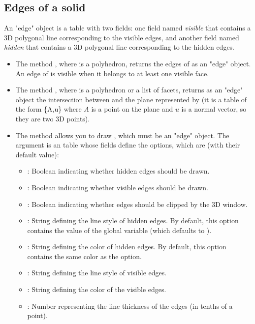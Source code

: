 \subsection{Edges of a solid}

An "edge" object is a table with two fields: one field named \emph{visible} that contains a 3D polygonal line corresponding to the visible edges, and another field named \emph{hidden} that contains a 3D polygonal line corresponding to the hidden edges.

\begin{itemize}
    \item The method , where  is a polyhedron, returns the edges of  as an "edge" object. An edge of  is visible when it belongs to at least one visible face.

     \item The method , where  is a polyhedron or a list of facets, returns as an "edge" object the intersection between  and the plane represented by  (it is a table of the form \{A,u\} where $A$ is a point on the plane and $u$ is a normal vector, so they are two 3D points).

    \item The method  allows you to draw , which must be an "edge" object. The argument  is an table whose fields define the options, which are (with their default value):
\begin{itemize}
    \item {}: Boolean indicating whether hidden edges should be drawn.
    \item {}: Boolean indicating whether visible edges should be drawn.
    \item {}: Boolean indicating whether edges should be clipped by the 3D window.
    \item {}: String defining the line style of hidden edges. By default, this option contains the value of the global variable  (which defaults to ).
    \item {}: String defining the color of hidden edges. By default, this option contains the same color as the  option.
    \item {}: String defining the line style of visible edges.
     \item {}: String defining the color of the visible edges.
    \item {}: Number representing the line thickness of the edges (in tenths of a point).
\end{itemize}


\end{itemize}
